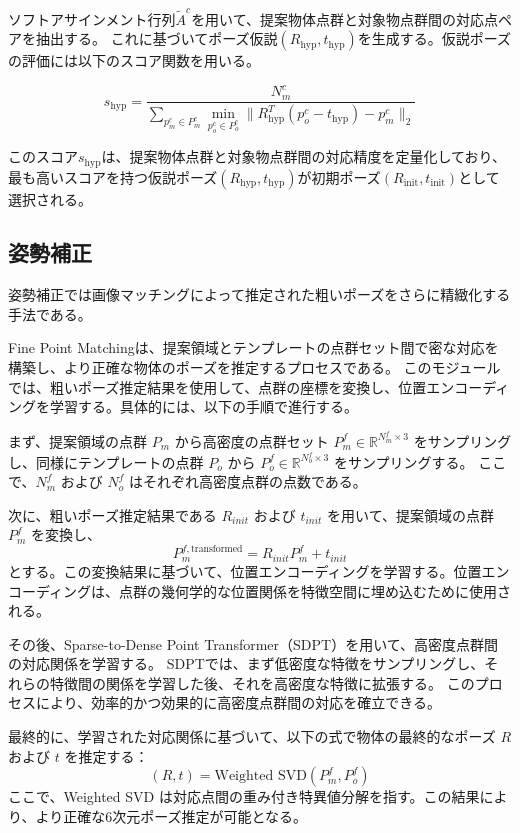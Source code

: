 ソフトアサインメント行列$\tilde{A}^c$を用いて、提案物体点群と対象物点群間の対応点ペアを抽出する。
これに基づいてポーズ仮説$(R_{\text{hyp}}, t_{\text{hyp}})$を生成する。仮説ポーズの評価には以下のスコア関数を用いる。

\[
s_{\text{hyp}} = \frac{N_m^c}{\sum_{p_m^c \in P_m^c} \min_{p_o^c \in P_o^c} \| R_{\text{hyp}}^T (p_o^c - t_{\text{hyp}}) - p_m^c \|_2 }
\]

このスコア$s_{\text{hyp}}$は、提案物体点群と対象物点群間の対応精度を定量化しており、最も高いスコアを持つ仮説ポーズ$(R_{\text{hyp}}, t_{\text{hyp}})$が初期ポーズ$(R_{\text{init}}, t_{\text{init}})$として選択される。%


\subsection{姿勢補正}
姿勢補正では画像マッチングによって推定された粗いポーズをさらに精緻化する手法である。

Fine Point Matchingは、提案領域とテンプレートの点群セット間で密な対応を構築し、より正確な物体のポーズを推定するプロセスである。
このモジュールでは、粗いポーズ推定結果を使用して、点群の座標を変換し、位置エンコーディングを学習する。具体的には、以下の手順で進行する。

まず、提案領域の点群 $P_m$ から高密度の点群セット $P_m^f \in \mathbb{R}^{N_m^f \times 3}$ をサンプリングし、同様にテンプレートの点群 $P_o$ から $P_o^f \in \mathbb{R}^{N_o^f \times 3}$ をサンプリングする。
ここで、$N_m^f$ および $N_o^f$ はそれぞれ高密度点群の点数である。

次に、粗いポーズ推定結果である $R_{init}$ および $t_{init}$ を用いて、提案領域の点群 $P_m^f$ を変換し、
\[
P_m^{f, \text{transformed}} = R_{init} P_m^f + t_{init}
\]
とする。この変換結果に基づいて、位置エンコーディングを学習する。位置エンコーディングは、点群の幾何学的な位置関係を特徴空間に埋め込むために使用される。

その後、Sparse-to-Dense Point Transformer（SDPT）を用いて、高密度点群間の対応関係を学習する。
SDPTでは、まず低密度な特徴をサンプリングし、それらの特徴間の関係を学習した後、それを高密度な特徴に拡張する。
このプロセスにより、効率的かつ効果的に高密度点群間の対応を確立できる。

最終的に、学習された対応関係に基づいて、以下の式で物体の最終的なポーズ $R$ および $t$ を推定する：
\[
(R, t) = \text{Weighted SVD}(P_m^f, P_o^f)
\]
ここで、Weighted SVD は対応点間の重み付き特異値分解を指す。この結果により、より正確な6次元ポーズ推定が可能となる。

